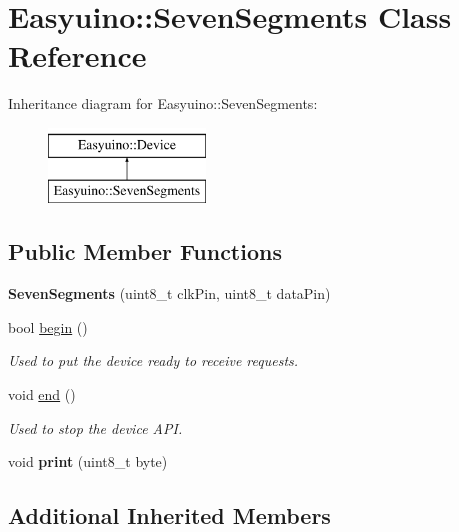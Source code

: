 \hypertarget{class_easyuino_1_1_seven_segments}{}\section{Easyuino\+:\+:Seven\+Segments Class Reference}
\label{class_easyuino_1_1_seven_segments}
Inheritance diagram for Easyuino\+:\+:Seven\+Segments\+:\begin{figure}[H]
\begin{center}
\leavevmode
\includegraphics[height=2.000000cm]{class_easyuino_1_1_seven_segments}
\end{center}
\end{figure}
\subsection*{Public Member Functions}
\begin{DoxyCompactItemize}
\item 
\mbox{\label{class_easyuino_1_1_seven_segments_a4a892bc5fe3f8b27cc6b7efbd31e8012}} 
{\bfseries Seven\+Segments} (uint8\+\_\+t clk\+Pin, uint8\+\_\+t data\+Pin)
\item 
bool \hyperlink{class_easyuino_1_1_seven_segments_ab59d5cbdc22567fb97854f32d899e02d}{begin} ()
\begin{DoxyCompactList}\small\item\em Used to put the device ready to receive requests. \end{DoxyCompactList}\item 
void \hyperlink{class_easyuino_1_1_seven_segments_afea49385382a7b9c597b4fe42a003fee}{end} ()
\begin{DoxyCompactList}\small\item\em Used to stop the device A\+PI. \end{DoxyCompactList}\item 
\mbox{\label{class_easyuino_1_1_seven_segments_a37d542d1ca55d2733c2f11c8efc79f0f}} 
void {\bfseries print} (uint8\+\_\+t byte)
\end{DoxyCompactItemize}
\subsection*{Additional Inherited Members}


